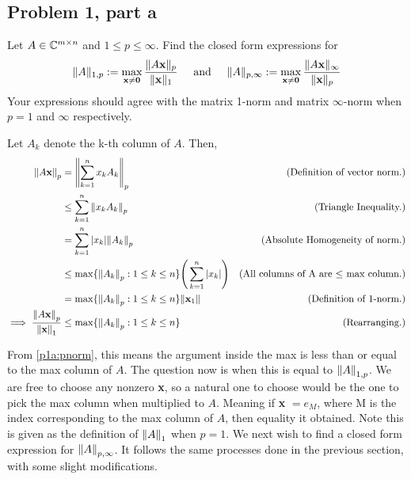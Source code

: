 \subsection{Problem 1, part a} Let $A \in \mathbb{C}^{m \times n}$ and $1 \leq p \leq \infty$. Find the closed form expressions for 
\[
\lVert A \rVert_{1, p} := \max_{\textbf{x} \neq \textbf{0}} \frac{\lVert A\textbf{x} \rVert_{p}}{\lVert \textbf{x} \rVert_1} \hspace{5mm} \text{and} \hspace{5mm} \lVert A \rVert_{p, \infty} := \max_{\textbf{x} \neq \textbf{0}} \frac{\lVert A\textbf{x} \rVert_{\infty}}{\lVert \textbf{x} \rVert_p} 
\]
Your expressions should agree with the matrix 1-norm and matrix $\infty$-norm when $p = 1$ and $\infty$ respectively.
\partbreak
\begin{solution}

    Let $A_k$ denote the k-th column of $A$. Then, 
    \alignbreak
    \begin{align}
        \norm{A\textbf{x}}_p &= \norm{\sum_{k = 1}^n x_kA_k}_p &\text{(Definition of vector norm.)}\nonumber\\
        &\leq \sum_{k = 1}^n \norm{x_kA_k}_p &\text{(Triangle Inequality.)}\nonumber\\
        &= \sum_{k = 1}^n|x_k|\norm{A_k}_p &\text{(Absolute Homogeneity of norm.)}\nonumber\\
        &\leq \max \{ \norm{A_k}_p : 1 \leq k \leq n \} \Bigg(\sum_{k = 1}^n |x_k| \Bigg) &\text{(All columns of A are $\leq$ max column.)}\nonumber\\
        &=\max \{ \norm{A_k}_p : 1 \leq k \leq n \} \norm{\textbf{x}_1} &\text{(Definition of 1-norm.)}\nonumber\\
        \implies \frac{\norm{A\textbf{x}}_p}{\norm{\textbf{x}}_1} &\leq \max \{\norm{A_k}_p : 1 \leq k \leq n \} &\text{(Rearranging.)}\label{p1a:pnorm}
    \end{align}
    \alignbreak

    From \ref{p1a:pnorm}, this means the argument inside the max is less than or equal to the max column of $A$. The question now is when this is equal to $\norm{A}_{1,p}$. We are free to choose any nonzero \textbf{x}, so a natural one to choose would be the one to pick the max column when multiplied to $A$. Meaning if \textbf{x} $= e_M$, where M is the index corresponding to the max column of $A$, then equality it obtained. Note this is given as the definition of $\norm{A}_1$ when $p = 1$. 
\newpage
    We next wish to find a closed form expression for $\norm{A}_{p, \infty}$. It follows the same processes done in the previous section, with some slight modifications.


\end{solution}

